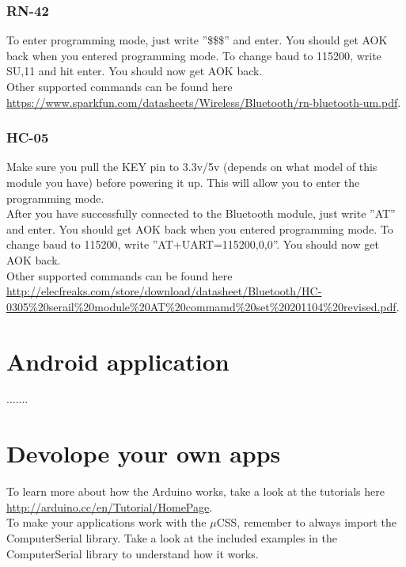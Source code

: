 				\subsubsection{RN-42}
				To enter programming mode, just write ''\$\$\$'' and enter. You should get AOK back when you entered programming mode. To change baud to 115200, write SU,11 and hit enter. You should now get AOK back.\\
				
				Other supported commands can be found here \url{https://www.sparkfun.com/datasheets/Wireless/Bluetooth/rn-bluetooth-um.pdf}.

				\subsubsection{HC-05}
				Make sure you pull the KEY pin to 3.3v/5v (depends on what model of this module you have) before powering it up. This will allow you to enter the programming mode.\\
				
				After you have successfully connected to the Bluetooth module, just write ''AT'' and enter. You should get AOK back when you entered programming mode. To change baud to 115200, write ''AT+UART=115200,0,0''. You should now get AOK back.\\
				
				Other supported commands can be found here \url{http://elecfreaks.com/store/download/datasheet/Bluetooth/HC-0305%20serail%20module%20AT%20commamd%20set%20201104%20revised.pdf}.
				
	\section{Android application}\label{sec:install-android-application}
	.......
	
	\section{Devolope your own apps}
	To learn more about how the Arduino works, take a look at the tutorials here \url{http://arduino.cc/en/Tutorial/HomePage}.\\
	
	To make your applications work with the $\mu$CSS, remember to always import the ComputerSerial library. Take a look at the included examples in the ComputerSerial library to understand how it works.